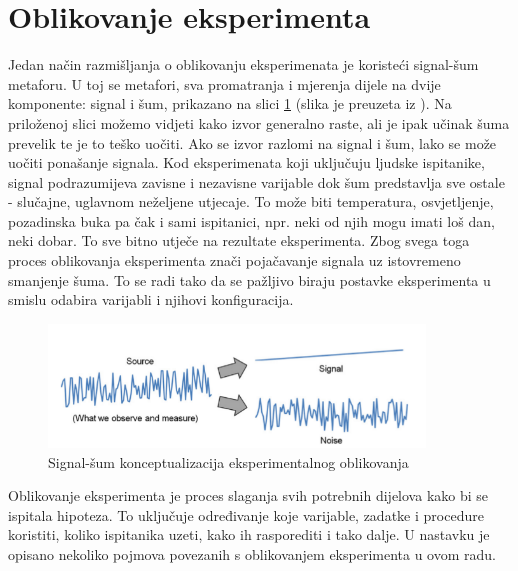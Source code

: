 \documentclass[times, utf8, zavrsni, numeric]{fer}
\begin{document}
\section{Oblikovanje eksperimenta}
Jedan način razmišljanja o oblikovanju eksperimenata je koristeći signal-šum metaforu. U toj se metafori, sva promatranja i mjerenja dijele na dvije komponente: signal i šum, prikazano na slici \ref{fig:signal} (slika je preuzeta iz \cite{hci}). Na priloženoj slici možemo vidjeti kako izvor generalno raste, ali je ipak učinak šuma prevelik te je to teško uočiti. Ako se izvor razlomi na signal i šum, lako se može uočiti ponašanje signala. Kod eksperimenata koji uključuju ljudske ispitanike, signal podrazumijeva zavisne i nezavisne varijable dok šum predstavlja sve ostale - slučajne, uglavnom neželjene utjecaje. To može biti temperatura, osvjetljenje, pozadinska buka pa čak i sami ispitanici, npr. neki od njih mogu imati loš dan, neki dobar. To sve bitno utječe na rezultate eksperimenta. Zbog svega toga proces oblikovanja eksperimenta znači pojačavanje signala uz istovremeno smanjenje šuma. To se radi tako da se pažljivo biraju postavke eksperimenta u smislu odabira varijabli i njihovi konfiguracija.

\begin{figure}[htb]
\centering
\includegraphics[width=10cm]{img/signal.png}
\caption{Signal-šum konceptualizacija eksperimentalnog oblikovanja}
\label{fig:signal}
\end{figure}

Oblikovanje eksperimenta je proces slaganja svih potrebnih dijelova kako bi se ispitala hipoteza. To uključuje određivanje koje varijable, zadatke i procedure koristiti, koliko ispitanika uzeti, kako ih rasporediti i tako dalje. U nastavku je opisano nekoliko pojmova povezanih s oblikovanjem eksperimenta u ovom radu.
\end{document}
